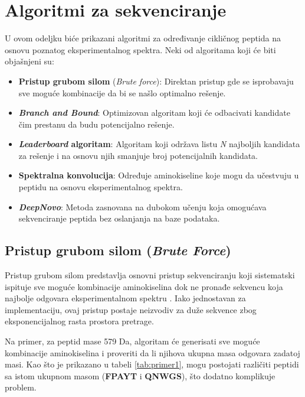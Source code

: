 \documentclass[12pt,oneside]{memoir}
\begin{document}
\chapter{Algoritmi za sekvenciranje}
U ovom odeljku biće prikazani algoritmi za određivanje cikličnog peptida na osnovu poznatog eksperimentalnog spektra. Neki od algoritama koji će biti objašnjeni su:
\begin{itemize}
    \item \textbf{Pristup grubom silom} (\emph{Brute force}): Direktan pristup gde se isprobavaju sve moguće kombinacije da bi se našlo optimalno rešenje.
    \item \textbf{\emph{Branch and Bound}}: Optimizovan algoritam koji će odbacivati kandidate čim prestanu da budu potencijalno rešenje.
    \item \textbf{\emph{Leaderboard} algoritam}: Algoritam koji održava listu \emph{N} najboljih kandidata za rešenje i na osnovu njih smanjuje broj potencijalnih kandidata.
    \item \textbf{Spektralna konvolucija}: Određuje aminokiseline koje mogu da učestvuju u peptidu na osnovu eksperimentalnog spektra.
    \item \textbf{\emph{DeepNovo}}: Metoda zasnovana na dubokom učenju koja omogućava sekvenciranje peptida bez oslanjanja na baze podataka.
\end{itemize}

\section{Pristup grubom silom (\emph{Brute Force})}
Pristup grubom silom predstavlja osnovni pristup sekvenciranju koji sistematski ispituje sve moguće kombinacije aminokiselina dok ne pronađe sekvencu koja najbolje odgovara eksperimentalnom spektru \cite{online_lecture, online_book}. Iako jednostavan za implementaciju, ovaj pristup postaje neizvodiv za duže sekvence zbog eksponencijalnog rasta prostora pretrage.

Na primer, za peptid mase 579 Da, algoritam će generisati sve moguće kombinacije aminokiselina i proveriti da li njihova ukupna masa odgovara zadatoj masi. Kao što je prikazano u tabeli \ref{tab:primer1}, mogu postojati različiti peptidi sa istom ukupnom masom (\textbf{FPAYT} i \textbf{QNWGS}), što dodatno komplikuje problem.
\end{document}
